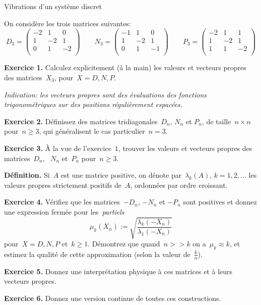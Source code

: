 \documentclass[a4paper,11pt]{article}
\begin{document}
\thispagestyle{empty}

\begin{center}
	\Large Vibrations d'un système discret
\end{center}

On considère les trois matrices suivantes:
\[
	D_3=\begin{pmatrix}
		-2 & 1 & 0 \\
		1 & -2 & 1 \\
		0 & 1 & -2 \\
	\end{pmatrix}
	\qquad
	N_3=\begin{pmatrix}
		-1 & 1 & 0 \\
		1 & -2 & 1 \\
		0 & 1 & -1 \\
	\end{pmatrix}
	\qquad
	P_3=\begin{pmatrix}
		-2 & 1 & 1 \\
		1 & -2 & 1 \\
		1 & 1 & -2 \\
	\end{pmatrix}
\]

{\bf Exercice 1.}
Calculez explicitement (à la main) les valeurs et vecteurs propres des
matrices~$X_3$, pour~$X=D,N,P$.

{\sl Indication: les vecteurs propres sont des évaluations des fonctions
trigonométriques sur des positions régulièrement espacées.}

{\bf Exercice 2.}
Définissez des matrices tridiagonales~$D_n$, $N_n$ et $P_n$, de taille~$n\times
n$ pour~$n\ge 3$, qui généralisent le cas particulier~$n=3$.

{\bf Exercice 3.}
À la vue de l'exercice~$1$, trouver les valeurs et vecteurs propres des
matrices~$D_n$, ~$N_n$ et~$P_n$ pour~$n\ge 3$.

{\bf Définition.}
Si~$A$ est une matrice positive, on dénote par~$\lambda_k(A)$, $k=1,2,\ldots$
les valeurs propres strictement positifs de~$A$, ordonnées par ordre croissant.

{\bf Exercice 4.}
Vérifiez que les matrices~$-D_n$, $-N_n$ et $-P_n$ sont positives et donnez une
expression fermée pour les~\emph{partiels}
\[
	\mu_k(X_n) := \sqrt{\frac{\lambda_k(-X_n)}{\lambda_1(-X_n)}}
\]
pour~$X=D,N,P$ et~$k\ge 1$.  Démontrez que quand~$n>>k$ on a~$\mu_k\approx k$,
et estimez la qualité de cette approximation (selon la valeur de~$\tfrac kn$).

{\bf Exercice 5.}
Donnez une interprétation physique à ces matrices et à leurs vecteurs propres.

{\bf Exercice 6.}
Donnez une version continue de toutes ces constructions.
\end{document}
